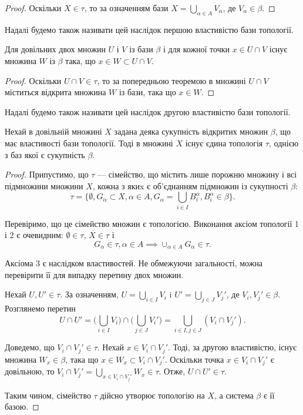 \begin{proof}
Оскільки $X \in \tau$, то за означенням бази
$X = \bigcup_{\alpha \in A} V_\alpha$, де $V_\alpha \in \beta$.
\end{proof}

Надалі будемо також називати цей наслідок першою властивістю бази топології.

\begin{corollary}
Для довільних двох множин $U$ і $V$ із бази
$\beta$ і для кожної точки $x \in U \cap V$ існує множина $W$ із $\beta$ така,
що $x \in W \subset U \cap V$.
\end{corollary}

\begin{proof}
Оскільки $U \cap V \in \tau$, то за попередньою теоремою в
множині $U \cap V$ міститься відкрита множина $W$ із бази, така
що $x \in W$.
\end{proof}

Надалі будемо також називати цей наслідок другою властивістю бази топології.

\begin{theorem}
Нехай в довільній множині $X$ задана деяка сукупність
відкритих множин $\beta$, що має властивості бази топології. Тоді в
множині $X$ існує єдина топологія $\tau$, однією з баз якої є
сукупність $\beta$.
\end{theorem}

\begin{proof}
Припустимо, що $\tau$ --- сімейство, що містить
лише порожню множину і всі підмножини множини $X$,
кожна з якиx є об'єднанням підмножин із сукупності $\beta$: \[ \tau = \Bigg\{ \emptyset, G_\alpha \subset X, \alpha \in A, G_\alpha = \bigcup_{i \in I} B_i^\alpha, B_i^\alpha \in \beta \Bigg\} . \]

Перевіримо, що це сімейство множин є топологією.
Виконання аксіом топології 1 і 2 є очевидним: $\emptyset \in \tau$, $X \in \tau$ і
\[ G_\alpha \in \tau, \alpha \in A \implies \cup_{\alpha \in A} G_\alpha \in \tau. \]

Аксіома 3 є наслідком властивостей. Не обмежуючи загальності, можна
перевірити її для випадку перетину двох множин.

Нехай $U, U' \in \tau$. За означенням, $U = \bigcup_{i \in I} V_i$ i $U' = \bigcup_{j \in J} V_j'$, де $V_i, V_j' \in \beta$. Розглянемо перетин \[ U \cap U' = \Bigg( \bigcup_{i \in I} V_i \Bigg) \cap \Bigg( \bigcup_{j \in J} V_i' \Bigg) = \bigcup_{i \in I, j \in J} (V_i \cap V_j'). \]

Доведемо, що $V_i \cap V_j' \in \tau$. Нехай $x \in V_i \cap V_j'$. Тоді, за
другою властивістю, існує множина $W_x \in \beta$, така що $x \in W_x \subset V_i \cap V_j'$. Оскільки точка $x \in V_i \cap V_j'$ є довільною, то $V_i \cap V_j' = \bigcup_{x \in V_i \cap V_j'} W_x \in \tau$. Отже, $U \cap U' \in \tau$.

Таким чином, сімейство $\tau$ дійсно утворює топологію на
$X$, а система $\beta$ є її базою.
\end{proof}

